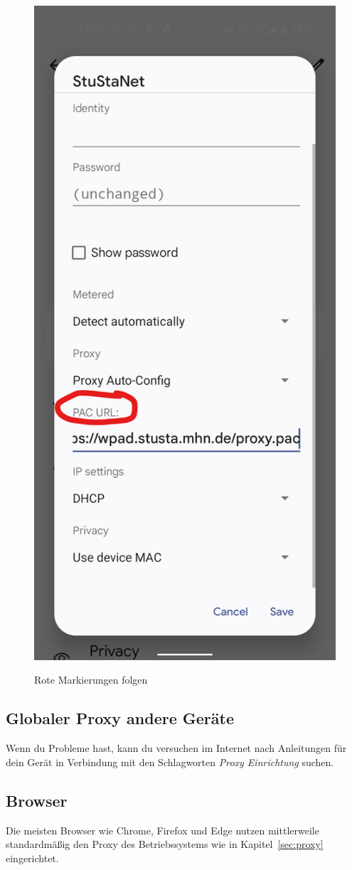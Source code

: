 \documentclass[a4paper,12pt]{scrartcl}
\begin{document}
\begin{figure}[h]
\begin{minipage}{0.24\textwidth}
		\includegraphics[width=0.7\linewidth,keepaspectratio]{Bilder/Android/android12_4}
	\end{minipage}
	Rote Markierungen folgen
\end{figure}

\subsection*{Globaler Proxy andere Geräte}
Wenn du Probleme hast, kann du versuchen im Internet nach Anleitungen für dein Gerät in Verbindung mit den Schlagworten \textit{Proxy Einrichtung} suchen.

\subsection*{Browser}
Die meisten Browser wie Chrome, Firefox und Edge nutzen mittlerweile standardmäßig den Proxy des Betriebssystems wie in Kapitel~\ref{sec:proxy} eingerichtet.
\end{document}
